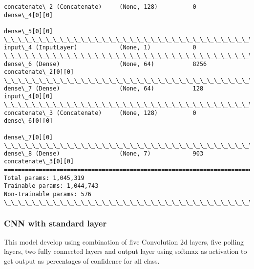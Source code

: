 \documentclass[11pt]{article}
\begin{document}
\begin{Verbatim}[commandchars=\\\{\}]
concatenate\_2 (Concatenate)     (None, 128)          0           dense\_4[0][0]                    
                                                                 dense\_5[0][0]                    
\_\_\_\_\_\_\_\_\_\_\_\_\_\_\_\_\_\_\_\_\_\_\_\_\_\_\_\_\_\_\_\_\_\_\_\_\_\_\_\_\_\_\_\_\_\_\_\_\_\_\_\_\_\_\_\_\_\_\_\_\_\_\_\_\_\_\_\_\_\_\_\_\_\_\_\_\_\_\_\_\_\_\_\_\_\_\_\_\_\_\_\_\_\_\_\_\_\_
input\_4 (InputLayer)            (None, 1)            0                                            
\_\_\_\_\_\_\_\_\_\_\_\_\_\_\_\_\_\_\_\_\_\_\_\_\_\_\_\_\_\_\_\_\_\_\_\_\_\_\_\_\_\_\_\_\_\_\_\_\_\_\_\_\_\_\_\_\_\_\_\_\_\_\_\_\_\_\_\_\_\_\_\_\_\_\_\_\_\_\_\_\_\_\_\_\_\_\_\_\_\_\_\_\_\_\_\_\_\_
dense\_6 (Dense)                 (None, 64)           8256        concatenate\_2[0][0]              
\_\_\_\_\_\_\_\_\_\_\_\_\_\_\_\_\_\_\_\_\_\_\_\_\_\_\_\_\_\_\_\_\_\_\_\_\_\_\_\_\_\_\_\_\_\_\_\_\_\_\_\_\_\_\_\_\_\_\_\_\_\_\_\_\_\_\_\_\_\_\_\_\_\_\_\_\_\_\_\_\_\_\_\_\_\_\_\_\_\_\_\_\_\_\_\_\_\_
dense\_7 (Dense)                 (None, 64)           128         input\_4[0][0]                    
\_\_\_\_\_\_\_\_\_\_\_\_\_\_\_\_\_\_\_\_\_\_\_\_\_\_\_\_\_\_\_\_\_\_\_\_\_\_\_\_\_\_\_\_\_\_\_\_\_\_\_\_\_\_\_\_\_\_\_\_\_\_\_\_\_\_\_\_\_\_\_\_\_\_\_\_\_\_\_\_\_\_\_\_\_\_\_\_\_\_\_\_\_\_\_\_\_\_
concatenate\_3 (Concatenate)     (None, 128)          0           dense\_6[0][0]                    
                                                                 dense\_7[0][0]                    
\_\_\_\_\_\_\_\_\_\_\_\_\_\_\_\_\_\_\_\_\_\_\_\_\_\_\_\_\_\_\_\_\_\_\_\_\_\_\_\_\_\_\_\_\_\_\_\_\_\_\_\_\_\_\_\_\_\_\_\_\_\_\_\_\_\_\_\_\_\_\_\_\_\_\_\_\_\_\_\_\_\_\_\_\_\_\_\_\_\_\_\_\_\_\_\_\_\_
dense\_8 (Dense)                 (None, 7)            903         concatenate\_3[0][0]              
==================================================================================================
Total params: 1,045,319
Trainable params: 1,044,743
Non-trainable params: 576
\_\_\_\_\_\_\_\_\_\_\_\_\_\_\_\_\_\_\_\_\_\_\_\_\_\_\_\_\_\_\_\_\_\_\_\_\_\_\_\_\_\_\_\_\_\_\_\_\_\_\_\_\_\_\_\_\_\_\_\_\_\_\_\_\_\_\_\_\_\_\_\_\_\_\_\_\_\_\_\_\_\_\_\_\_\_\_\_\_\_\_\_\_\_\_\_\_\_

    \end{Verbatim}

    \subsubsection{CNN with standard layer}\label{cnn-with-standard-layer}

This model develop using combination of five Convolution 2d layers, five
polling layers, two fully connected layers and output layer using
softmax as activation to get output as percentages of confidence for all
class.
\end{document}
